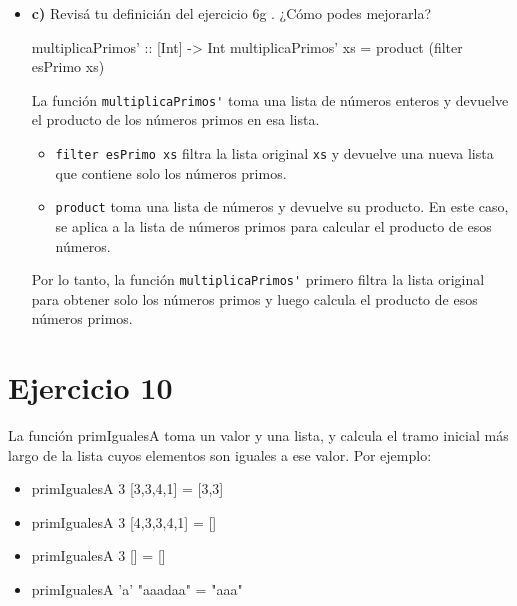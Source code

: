 \documentclass{article}
\begin{document}
\begin{itemize}
       \item 
        \textbf{c)} Revisá tu definicián del ejercicio 6g . ¿Cómo podes mejorarla?
    
\begin{haskell}
multiplicaPrimos' :: [Int] -> Int
multiplicaPrimos' xs = product (filter esPrimo xs)
\end{haskell}
            
            La función \verb|multiplicaPrimos'| toma una lista de números enteros y devuelve el producto de los números primos en esa lista.
            \begin{itemize}
            \item 
            \verb|filter esPrimo xs| filtra la lista original \verb|xs| y devuelve una nueva lista que contiene solo los números primos.
            \item 
            \verb|product| toma una lista de números y devuelve su producto. En este caso, se aplica a la lista de números primos para calcular el producto de esos números.
            \end{itemize}
            
            Por lo tanto, la función \verb|multiplicaPrimos'| primero filtra la lista original para obtener solo los números primos y luego calcula el producto de esos números primos.
        
\end{itemize}
    
\section*{Ejercicio 10}
La función primIgualesA toma un valor y una lista, y calcula el tramo inicial más largo de la lista cuyos elementos son iguales a ese valor. Por ejemplo:
\begin{itemize}
\item 
primIgualesA 3 [3,3,4,1] = [3,3]
\item 
primIgualesA 3 [4,3,3,4,1] = []
\item 
primIgualesA 3 [] = []
\item 
primIgualesA ’a’ "aaadaa" = "aaa"
\end{itemize}
\end{document}
